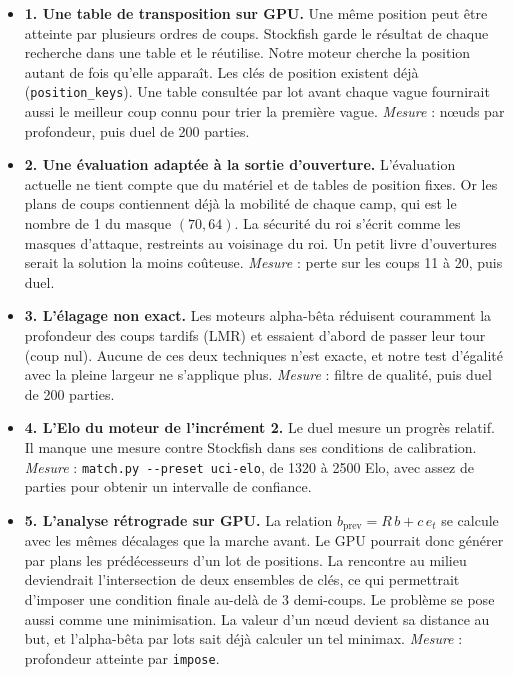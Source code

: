\documentclass[11pt,a4paper]{article}
\newcommand{\code}[1]{\texttt{#1}}
\newcounter{calcul}
\theoremstyle{plain}
\begin{document}
\begin{itemize}[itemsep=6pt]
\item \textbf{1. Une table de transposition sur GPU.} Une même position peut être atteinte par
plusieurs ordres de coups. Stockfish garde le résultat de chaque recherche dans une table et le
réutilise. Notre moteur cherche la position autant de fois qu'elle apparaît. Les clés de position
existent déjà (\code{position\_keys}). Une table consultée par lot avant chaque vague fournirait
aussi le meilleur coup connu pour trier la première vague. \emph{Mesure} : nœuds par profondeur,
puis duel de 200 parties.

\item \textbf{2. Une évaluation adaptée à la sortie d'ouverture.} L'évaluation actuelle ne tient
compte que du matériel et de tables de position fixes. Or les plans de coups contiennent déjà la
mobilité de chaque camp, qui est le nombre de 1 du masque $(70, 64)$. La sécurité du roi s'écrit
comme les masques d'attaque, restreints au voisinage du roi. Un petit livre d'ouvertures serait la
solution la moins coûteuse. \emph{Mesure} : perte sur les coups 11 à 20, puis duel.

\item \textbf{3. L'élagage non exact.} Les moteurs alpha-bêta réduisent couramment la profondeur
des coups tardifs (LMR) et essaient d'abord de passer leur tour (coup nul). Aucune de ces deux
techniques n'est exacte, et notre test d'égalité avec la pleine largeur ne s'applique plus.
\emph{Mesure} : filtre de qualité, puis duel de 200 parties.

\item \textbf{4. L'Elo du moteur de l'incrément 2.} Le duel mesure un progrès relatif. Il manque
une mesure contre Stockfish dans ses conditions de calibration. \emph{Mesure} :
\code{match.py -{}-preset uci-elo}, de 1320 à 2500 Elo, avec assez de parties pour obtenir un
intervalle de confiance.

\item \textbf{5. L'analyse rétrograde sur GPU.} La relation $b_{\text{prev}} = R\,b + c\,e_t$ se
calcule avec les mêmes décalages que la marche avant. Le GPU pourrait donc générer par plans les
prédécesseurs d'un lot de positions. La rencontre au milieu deviendrait l'intersection de deux
ensembles de clés, ce qui permettrait d'imposer une condition finale au-delà de 3 demi-coups. Le
problème se pose aussi comme une minimisation. La valeur d'un nœud devient sa distance au but, et
l'alpha-bêta par lots sait déjà calculer un tel minimax. \emph{Mesure} : profondeur atteinte par
\code{impose}.


\end{itemize}
\end{document}
